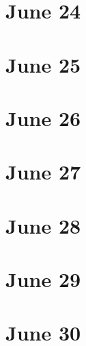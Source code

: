 \section{June 24}

\section{June 25}

\section{June 26}

\section{June 27}

\section{June 28}

\section{June 29}

\section{June 30}

